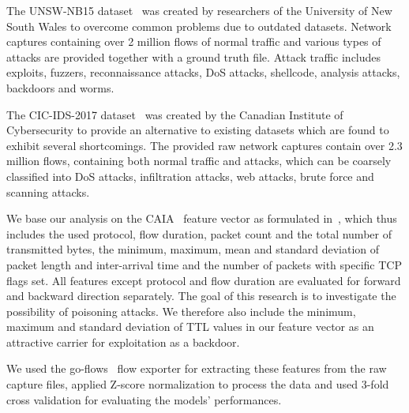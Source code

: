 \documentclass[10pt,sigconf,letterpaper,dvipsnames]{acmart}
\begin{document}
The UNSW-NB15 dataset~\cite{moustafa2015unsw} was created by researchers of the University of New South Wales to overcome common problems due to outdated datasets. Network captures containing over 2 million flows of normal traffic and various types of attacks are provided together with a ground truth file. Attack traffic includes exploits, fuzzers, reconnaissance attacks, DoS attacks, shellcode, analysis attacks, backdoors and worms.

The CIC-IDS-2017 dataset~\cite{Sharafaldin2018} was created by the Canadian Institute of Cybersecurity to provide an alternative to existing datasets which are found to exhibit several shortcomings. The provided raw network captures contain over 2.3 million flows, containing both normal traffic and attacks, which can be coarsely classified into DoS attacks, infiltration attacks, web attacks, brute force and scanning attacks.

We base our analysis on the CAIA~\cite{Williams2006} feature vector as formulated in~\cite{fares}, which thus includes the used protocol, flow duration, packet count and the total number of transmitted bytes, the minimum, maximum, mean and standard deviation of packet length and inter-arrival time and the number of packets with specific TCP flags set. All features except protocol and flow duration are evaluated for forward and backward direction separately. The goal of this research is to investigate the possibility of poisoning attacks. We therefore also include the minimum, maximum and standard deviation of TTL values in our feature vector as an attractive carrier for exploitation as a backdoor. %

We used the go-flows~\cite{goflows} flow exporter for extracting these features from the raw capture files, applied Z-score normalization to process the data and used 3-fold cross validation for evaluating the models' performances.
\end{document}
